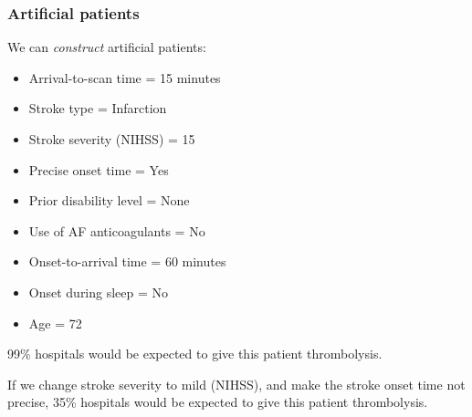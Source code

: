 \documentclass{beamer}
\begin{document}

\begin{frame}
\frametitle{Artificial patients}

We can \emph{construct} artificial patients:
\vspace{1mm}
\begin{footnotesize}
\begin{itemize}
    \item Arrival-to-scan time = 15 minutes 
    \item Stroke type  = Infarction
    \item Stroke severity (NIHSS) = 15
    \item Precise onset time = Yes
    \item Prior disability level = None
    \item Use of AF anticoagulants = No
    \item Onset-to-arrival time = 60 minutes
    \item Onset during sleep = No
    \item Age = 72
\end{itemize}
\end{footnotesize}

\vspace{2mm}

99\% hospitals would be expected to give this patient thrombolysis.

\vspace{2mm}

If we change stroke severity to mild (NIHSS), and make the stroke onset time not precise, 35\% hospitals would be expected to give this patient thrombolysis.

\end{frame}
\end{document}

